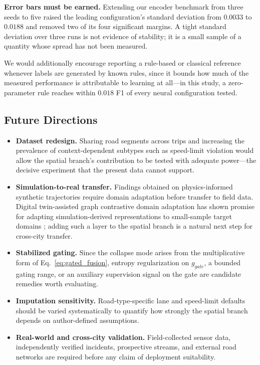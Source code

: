 \documentclass[journal]{IEEEtran}
\begin{document}
\textbf{Error bars must be earned.} Extending our encoder benchmark from three seeds to five raised the leading configuration's standard deviation from $0.0033$ to $0.0188$ and removed two of its four significant margins. A tight standard deviation over three runs is not evidence of stability; it is a small sample of a quantity whose spread has not been measured.

We would additionally encourage reporting a rule-based or classical reference whenever labels are generated by known rules, since it bounds how much of the measured performance is attributable to learning at all---in this study, a zero-parameter rule reaches within $0.018$ F1 of every neural configuration tested.

\subsection{Future Directions}
\label{sec:future_directions}
\begin{itemize}
  \item \textbf{Dataset redesign.} Sharing road segments across trips and increasing the prevalence of context-dependent subtypes such as speed-limit violation would allow the spatial branch's contribution to be tested with adequate power---the decisive experiment that the present data cannot support.
  \item \textbf{Simulation-to-real transfer.} Findings obtained on physics-informed synthetic trajectories require domain adaptation before transfer to field data. Digital twin-assisted graph contrastive domain adaptation has shown promise for adapting simulation-derived representations to small-sample target domains \cite{gcda_bearing}; adding such a layer to the spatial branch is a natural next step for cross-city transfer.
  \item \textbf{Stabilized gating.} Since the collapse mode arises from the multiplicative form of Eq.~\ref{eq:gated_fusion}, entropy regularization on $g_{gate}$, a bounded gating range, or an auxiliary supervision signal on the gate are candidate remedies worth evaluating.
  \item \textbf{Imputation sensitivity.} Road-type-specific lane and speed-limit defaults should be varied systematically to quantify how strongly the spatial branch depends on author-defined assumptions.
  \item \textbf{Real-world and cross-city validation.} Field-collected sensor data, independently verified incidents, prospective streams, and external road networks are required before any claim of deployment suitability.
\end{itemize}
\end{document}

